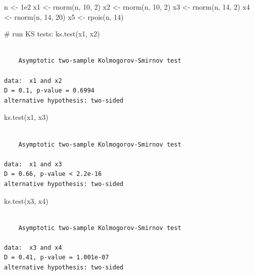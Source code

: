 \documentclass[
  13,
  letterpaper,
]{report}
\newenvironment{Shaded}{\begin{snugshade}}{\end{snugshade}}
\newcommand{\CommentTok}[1]{\textcolor[rgb]{0.37,0.37,0.37}{#1}}
\newcommand{\DecValTok}[1]{\textcolor[rgb]{0.68,0.00,0.00}{#1}}
\newcommand{\FloatTok}[1]{\textcolor[rgb]{0.68,0.00,0.00}{#1}}
\newcommand{\FunctionTok}[1]{\textcolor[rgb]{0.28,0.35,0.67}{#1}}
\newcommand{\NormalTok}[1]{\textcolor[rgb]{0.00,0.23,0.31}{#1}}
\newcommand{\OtherTok}[1]{\textcolor[rgb]{0.00,0.23,0.31}{#1}}
\begin{document}
\begin{Shaded}
\begin{Highlighting}[]
\NormalTok{n }\OtherTok{\textless{}{-}} \FloatTok{1e2}
\NormalTok{x1 }\OtherTok{\textless{}{-}} \FunctionTok{rnorm}\NormalTok{(n, }\DecValTok{10}\NormalTok{, }\DecValTok{2}\NormalTok{)}
\NormalTok{x2 }\OtherTok{\textless{}{-}} \FunctionTok{rnorm}\NormalTok{(n, }\DecValTok{10}\NormalTok{, }\DecValTok{2}\NormalTok{)}
\NormalTok{x3 }\OtherTok{\textless{}{-}} \FunctionTok{rnorm}\NormalTok{(n, }\DecValTok{14}\NormalTok{, }\DecValTok{2}\NormalTok{)}
\NormalTok{x4 }\OtherTok{\textless{}{-}} \FunctionTok{rnorm}\NormalTok{(n, }\DecValTok{14}\NormalTok{, }\DecValTok{20}\NormalTok{)}
\NormalTok{x5 }\OtherTok{\textless{}{-}} \FunctionTok{rpois}\NormalTok{(n, }\DecValTok{14}\NormalTok{)}

\CommentTok{\# run KS tests:}
\FunctionTok{ks.test}\NormalTok{(x1, x2)}
\end{Highlighting}
\end{Shaded}

\begin{verbatim}

    Asymptotic two-sample Kolmogorov-Smirnov test

data:  x1 and x2
D = 0.1, p-value = 0.6994
alternative hypothesis: two-sided
\end{verbatim}

\begin{Shaded}
\begin{Highlighting}[]
\FunctionTok{ks.test}\NormalTok{(x1, x3)}
\end{Highlighting}
\end{Shaded}

\begin{verbatim}

    Asymptotic two-sample Kolmogorov-Smirnov test

data:  x1 and x3
D = 0.66, p-value < 2.2e-16
alternative hypothesis: two-sided
\end{verbatim}

\begin{Shaded}
\begin{Highlighting}[]
\FunctionTok{ks.test}\NormalTok{(x3, x4)}
\end{Highlighting}
\end{Shaded}

\begin{verbatim}

    Asymptotic two-sample Kolmogorov-Smirnov test

data:  x3 and x4
D = 0.41, p-value = 1.001e-07
alternative hypothesis: two-sided
\end{verbatim}
\end{document}

